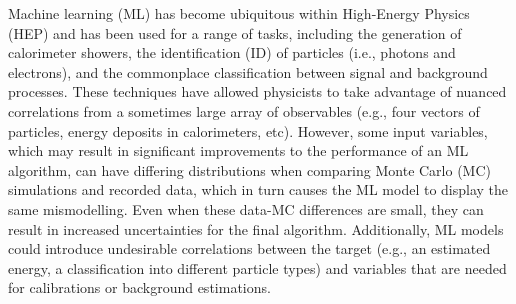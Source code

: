 \documentclass[letter, USenglish, 11pt, subfigure]{article}
\begin{document}






Machine learning (ML) has become ubiquitous within High-Energy Physics (HEP) and has been used for a range of tasks, including the generation of calorimeter showers, the identification (ID) of particles (i.e., photons and electrons), and the commonplace classification between signal and background processes. These techniques have allowed physicists to take advantage of nuanced correlations from a sometimes large array of observables (e.g., four vectors of particles, energy deposits in calorimeters, etc). However, some input variables, which may result in significant improvements to the performance of an ML algorithm, can have differing distributions when comparing Monte Carlo (MC) simulations and recorded data, which in turn causes the ML model to display the same mismodelling. Even when these data-MC differences are small, they can result in increased uncertainties for the final algorithm. Additionally, ML models could introduce undesirable correlations between the target (e.g., an estimated energy, a classification into different particle types) and variables that are needed for calibrations or background estimations.
\end{document}
